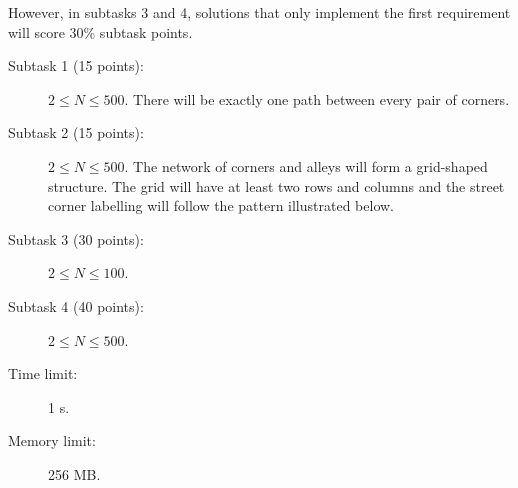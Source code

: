 \documentclass{boi2014}
\begin{document}
    However, in subtasks 3 and 4, solutions that only implement the
    first requirement will score 30\% subtask points. 

    \begin{description}
        \item[Subtask 1 (15 points):] $2 \le N \le 500$. There will be exactly one path between every pair of corners.
        \item[Subtask 2 (15 points):] $2 \le N \le 500$. The network of corners
        and alleys will form a grid-shaped structure. The grid will have at
        least two rows and columns and the street corner labelling will follow
        the pattern illustrated below.
        \begin{figure}[h!]
           \centering
        \end{figure}
        \item[Subtask 3 (30 points):] $2 \le N \le 100$.
        \item[Subtask 4 (40 points):] $2 \le N \le 500$.
    \end{description}

    \Constraints
    
    \begin{description}
        \item[Time limit:] 1 s.
        \item[Memory limit:] 256 MB.
    \end{description}

\end{document}
